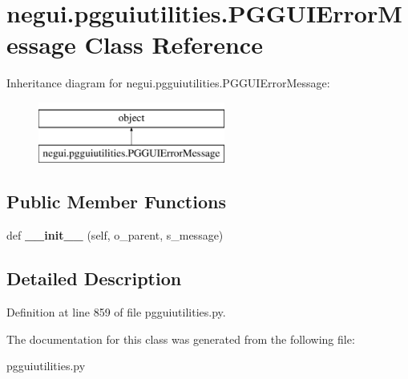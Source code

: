\hypertarget{classnegui_1_1pgguiutilities_1_1PGGUIErrorMessage}{}\section{negui.\+pgguiutilities.\+P\+G\+G\+U\+I\+Error\+Message Class Reference}
\label{classnegui_1_1pgguiutilities_1_1PGGUIErrorMessage}
Inheritance diagram for negui.\+pgguiutilities.\+P\+G\+G\+U\+I\+Error\+Message\+:\begin{figure}[H]
\begin{center}
\leavevmode
\includegraphics[height=2.000000cm]{classnegui_1_1pgguiutilities_1_1PGGUIErrorMessage}
\end{center}
\end{figure}
\subsection*{Public Member Functions}
\begin{DoxyCompactItemize}
\item 
def {\bfseries \+\_\+\+\_\+init\+\_\+\+\_\+} (self, o\+\_\+parent, s\+\_\+message)\hypertarget{classnegui_1_1pgguiutilities_1_1PGGUIErrorMessage_a420fb489448327d2a25e10f35a6c3589}{}\label{classnegui_1_1pgguiutilities_1_1PGGUIErrorMessage_a420fb489448327d2a25e10f35a6c3589}

\end{DoxyCompactItemize}


\subsection{Detailed Description}


Definition at line 859 of file pgguiutilities.\+py.



The documentation for this class was generated from the following file\+:\begin{DoxyCompactItemize}
\item 
pgguiutilities.\+py\end{DoxyCompactItemize}
